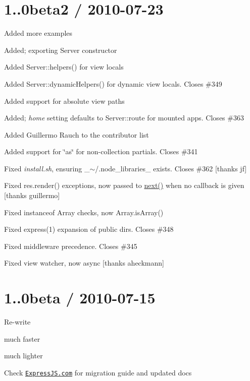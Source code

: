 \section*{1..\+0beta2 / 2010-\/07-\/23 }


\begin{DoxyItemize}
\item Added more examples
\item Added; exporting {\ttfamily Server} constructor
\item Added {\ttfamily Server\+::helpers()} for view locals
\item Added {\ttfamily Server\+::dynamic\+Helpers()} for dynamic view locals. Closes \#349
\item Added support for absolute view paths
\item Added; {\itshape home} setting defaults to {\ttfamily Server\+::route} for mounted apps. Closes \#363
\item Added Guillermo Rauch to the contributor list
\item Added support for \char`\"{}as\char`\"{} for non-\/collection partials. Closes \#341
\item Fixed {\itshape install.\+sh}, ensuring \+\_\+$\sim$/.node\+\_\+libraries\+\_\+ exists. Closes \#362 \mbox{[}thanks jf\mbox{]}
\item Fixed {\ttfamily res.\+render()} exceptions, now passed to {\ttfamily \hyperlink{057__caller__graphs_8tcl_a3f808a00e1b937978455d707851ab33a}{next()}} when no callback is given \mbox{[}thanks guillermo\mbox{]}
\item Fixed instanceof {\ttfamily Array} checks, now {\ttfamily Array.\+is\+Array()}
\item Fixed express(1) expansion of public dirs. Closes \#348
\item Fixed middleware precedence. Closes \#345
\item Fixed view watcher, now async \mbox{[}thanks aheckmann\mbox{]}
\end{DoxyItemize}

\section*{1..\+0beta / 2010-\/07-\/15 }


\begin{DoxyItemize}
\item Re-\/write
\begin{DoxyItemize}
\item much faster
\item much lighter
\item Check \href{http://expressjs.com}{\tt Express\+J\+S.\+com} for migration guide and updated docs
\end{DoxyItemize}
\end{DoxyItemize}

